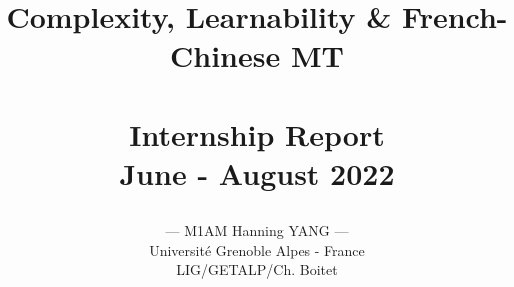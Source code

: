 

\documentclass[12pt, a4, english]{report}

\usepackage[utf8]{inputenc} 	%
\usepackage[T1]{fontenc}   

\usepackage{geometry}
\usepackage{graphicx}
\usepackage{amsmath}
\usepackage{amsmath,bm}
\usepackage{dsfont}
\usepackage{amssymb}
\usepackage{float}
\usepackage{pifont}
\usepackage{url}
\usepackage{minitoc}
\usepackage{natbib}			%

\makeatletter
\newcommand{\dotminus}{\mathbin{\text{\@dotminus}}}
\newcommand{\@dotminus}{%
  \ooalign{\hidewidth\raise1ex\hbox{.}\hidewidth\cr$\m@th-$\cr}%
}
\makeatother
\setcounter{tocdepth}{4}
\setcounter{secnumdepth}{4}
\geometry{left=2.9cm, right=2.9cm, top=2.5cm, bottom=2.5cm}
\title{Complexity, Learnability \& French-Chinese MT\\
~\\
\Large
Internship Report\\ 
June - August 2022\\
\author{
	--- M1AM Hanning YANG --- \\
Université Grenoble Alpes - France\\
LIG/GETALP/Ch. Boitet
	}
}

\date{}

\dominitoc
\maketitle
\newpage
\tableofcontents
\newpage
%


